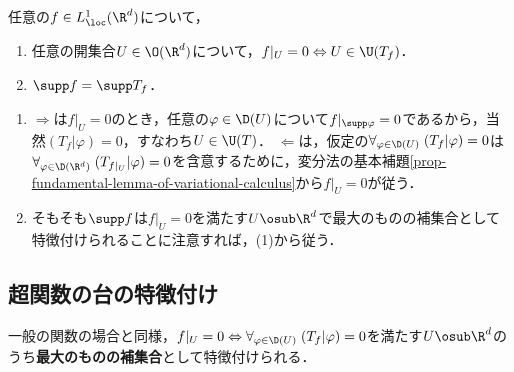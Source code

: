 \documentclass[uplatex,dvipdfmx]{jsreport}
\begin{document}
\begin{proposition}[整合性]
    任意の$f\in L^1_\loc(\R^d)$について，
    \begin{enumerate}
        \item 任意の開集合$U\in\O(\R^d)$について，$f|_{U}=0\Leftrightarrow U\in\U(T_f)$．
        \item $\supp f=\supp T_f$．
    \end{enumerate}
\end{proposition}
\begin{Proof}\mbox{}
    \begin{enumerate}
        \item $\Rightarrow$は$f|_{U}=0$のとき，任意の$\varphi\in\D(U)$について$f|_{\supp\varphi}=0$であるから，当然$(T_f|\varphi)=0$，すなわち$U\in\U(T)$．
        $\Leftarrow$は，仮定の$\forall_{\varphi\in\D(U)}\;(T_f|\varphi)=0$は$\forall_{\varphi\in\D(\R^d)}\;(T_{f|_U}|\varphi)=0$を含意するために，変分法の基本補題\ref{prop-fundamental-lemma-of-variational-calculus}から$f|_U=0$が従う．
        \item そもそも$\supp f$は$f|_{U}=0$を満たす$U\osub\R^d$で最大のものの補集合として特徴付けられることに注意すれば，(1)から従う．
    \end{enumerate}
\end{Proof}

\subsection{超関数の台の特徴付け}

\begin{tcolorbox}[colframe=ForestGreen, colback=ForestGreen!10!white,breakable,colbacktitle=ForestGreen!40!white,coltitle=black,fonttitle=\bfseries\sffamily,
title=]
    一般の関数の場合と同様，$f|_{U}=0\Leftrightarrow\forall_{\varphi\in\D(U)}\;(T_f|\varphi)=0$を満たす$U\osub\R^d$のうち\textbf{最大のものの補集合}として特徴付けられる．
\end{tcolorbox}
\end{document}
